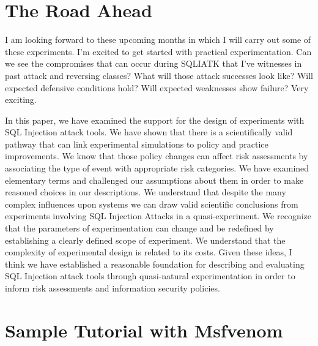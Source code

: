 \section{The Road Ahead}
I am looking forward to these upcoming months in which I will carry out some of these experiments.  I'm excited to get started with practical experimentation.  Can we see the compromises that can occur during SQLIATK that I've witnesses in past \gls{attack} and reversing classes?  What will those \gls{attack} successes look like?  Will expected defensive conditions hold?  Will expected weaknesses show failure?  Very exciting.

In this paper, we have examined the support for the design of experiments with SQL Injection \gls{attack} tools.  We have shown that there is a scientifically valid pathway that can link experimental simulations to policy and practice improvements.  We know that those policy changes can affect risk assessments by associating the type of event with appropriate risk categories.  We have examined elementary terms and challenged our assumptions about them in order to make reasoned choices in our descriptions.  We understand that despite the many complex influences upon systems we can draw valid scientific conclusions from experiments involving SQL Injection Attacks in a quasi-experiment.  We recognize that the parameters of experimentation can change and be redefined by establishing a clearly defined scope of experiment.  We understand that the complexity of experimental design is related to its costs.  Given these ideas, I think we have established a reasonable foundation for describing and evaluating SQL Injection \gls{attack} tools through quasi-natural experimentation in order to inform risk assessments and information security policies.

\section{Sample Tutorial with Msfvenom}

